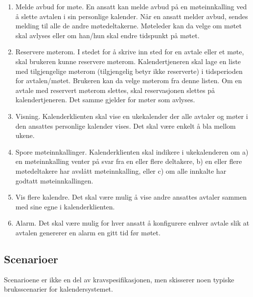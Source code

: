 \begin{enumerate}
\item
Melde avbud for møte. En ansatt kan melde avbud på en møteinnkalling ved å slette avtalen i sin personlige kalender. Når en ansatt melder avbud, sendes melding til alle de andre møtedeltakerne. Møteleder kan da velge om møtet skal avlyses eller om han/hun skal endre tidspunkt på møtet.

\item
Reservere møterom. I stedet for å skrive inn sted for en avtale eller et møte, skal brukeren kunne reservere møterom. Kalendertjeneren skal lage en liste med tilgjengelige møterom (tilgjengelig betyr ikke reserverte) i tidsperioden for avtalen/møtet. Brukeren kan da velge møterom fra denne listen. Om en avtale med reservert møterom slettes, skal reservasjonen slettes på kalendertjeneren. Det samme gjelder for møter som avlyses.

\item
Visning. Kalenderklienten skal vise en ukekalender der alle avtaler og møter i den ansattes personlige kalender vises. Det skal være enkelt å bla mellom ukene.

\item
Spore møteinnkallinger. Kalenderklienten skal indikere i ukekalenderen om a) en møteinnkalling venter på svar fra en eller flere deltakere, b) en eller flere møtedeltakere har avslått møteinnkalling, eller c) om alle innkalte har godtatt møteinnkallingen.

\item
Vis flere kalendre. Det skal være mulig å vise andre ansattes avtaler sammen med sine egne i kalenderklienten.

\item
Alarm. Det skal være mulig for hver ansatt å konfigurere enhver avtale slik at avtalen genererer en alarm en gitt tid før møtet. 

\end{enumerate}

\subsection{Scenarioer}

Scenarioene er ikke en del av kravspesifikasjonen, men skisserer noen typiske bruksscenarier for kalendersystemet.


